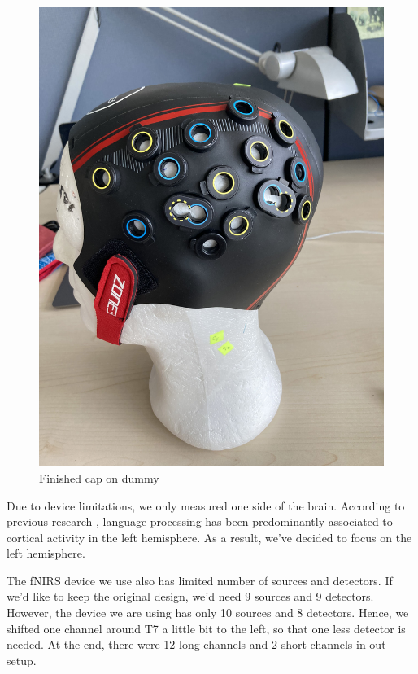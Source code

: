 \begin{figure}
\begin{minipage}[c]{.4\linewidth}
  \includegraphics[scale= 0.05, angle= -90, origin= c] {bilder/IMG_9768.jpg}
  \caption{Finished cap on dummy}
  \label{fig:test2}
\end{minipage}
\end{figure}

Due to device limitations, we only measured one side of the brain. According to previous research \cite {Frost1999-vs} , language processing has been predominantly associated to cortical activity in the left hemisphere. As a result, we've decided to focus on the left hemisphere.

The fNIRS device we use also has limited number of sources and detectors. If we'd like to keep the original design, we'd need 9 sources and 9 detectors. However, the device we are using has only 10 sources and 8 detectors. Hence, we shifted one channel around T7 a little bit to the left, so that one less detector is needed. At the end, there were 12 long channels and 2 short channels in out setup.

